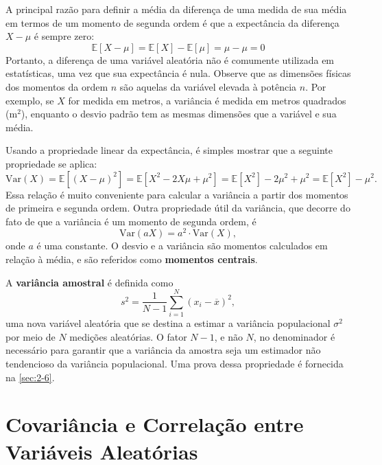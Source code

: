 A principal razão para definir a média da diferença de uma medida de sua média em termos de um momento de segunda ordem é que a expectância da diferença $X - \mu$ é sempre zero:
\begin{equation*}
\mathbb{E}[X - \mu] = \mathbb{E}[X] - \mathbb{E}[\mu] = \mu - \mu = 0
\end{equation*}
Portanto, a diferença de uma variável aleatória não é comumente utilizada em estatísticas, uma vez que sua expectância é nula. Observe que as dimensões físicas dos momentos da ordem $n$ são aquelas da variável elevada à potência $n$. Por exemplo, se $X$ for medida em metros, a variância é medida em metros quadrados ($\text{m}^2$), enquanto o desvio padrão tem as mesmas dimensões que a variável e sua média.

Usando a propriedade linear da expectância, é simples mostrar que a seguinte propriedade se aplica:
\begin{equation}\label{2.12}
\text{Var}(X) = \mathbb{E}[(X - \mu)^2] = \mathbb{E}[X^2 - 2X\mu + \mu^2] = \mathbb{E}[X^2] - 2\mu^2 + \mu^2 = \mathbb{E}[X^2] - \mu^2.
\end{equation}
Essa relação é muito conveniente para calcular a variância a partir dos momentos de primeira e segunda ordem. Outra propriedade útil da variância, que decorre do fato de que a variância é um momento de segunda ordem, é
\begin{equation}
\text{Var}(aX) = a^2 \cdot \text{Var}(X),
\end{equation}
onde $a$ é uma constante. O desvio e a variância são momentos calculados em relação à média, e são referidos como \textbf{momentos centrais}.

A \textbf{variância amostral} é definida como
\begin{equation}\label{2.14}
s^2 = \dfrac{1}{N -1} \sum_{i=1}^N (x_i - \overline{x})^2,
\end{equation}
uma nova variável aleatória que se destina a estimar a variância populacional $\sigma^2$ por meio de $N$ medições aleatórias. O fator $N - 1$, e não $N$, no denominador é necessário para garantir que a variância da amostra seja um estimador não tendencioso da variância populacional. Uma prova dessa propriedade é fornecida na \autoref{sec:2-6}.

\section{Covariância e Correlação entre Variáveis Aleatórias}

